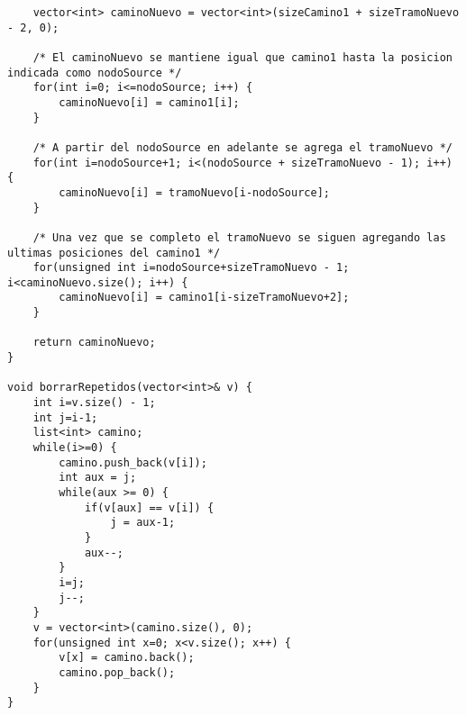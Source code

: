 \begin{lstlisting}
	vector<int> caminoNuevo = vector<int>(sizeCamino1 + sizeTramoNuevo - 2, 0);

	/* El caminoNuevo se mantiene igual que camino1 hasta la posicion indicada como nodoSource */
	for(int i=0; i<=nodoSource; i++) {
		caminoNuevo[i] = camino1[i];
	}

	/* A partir del nodoSource en adelante se agrega el tramoNuevo */
	for(int i=nodoSource+1; i<(nodoSource + sizeTramoNuevo - 1); i++) {
		caminoNuevo[i] = tramoNuevo[i-nodoSource];
	}

	/* Una vez que se completo el tramoNuevo se siguen agregando las ultimas posiciones del camino1 */
	for(unsigned int i=nodoSource+sizeTramoNuevo - 1; i<caminoNuevo.size(); i++) {
		caminoNuevo[i] = camino1[i-sizeTramoNuevo+2];
	}
	
	return caminoNuevo;
}

void borrarRepetidos(vector<int>& v) {
    int i=v.size() - 1;
    int j=i-1;
    list<int> camino;
    while(i>=0) {
        camino.push_back(v[i]);
        int aux = j;
        while(aux >= 0) {
            if(v[aux] == v[i]) {
            	j = aux-1;
            }
            aux--;
        }
        i=j;
        j--;
    }
    v = vector<int>(camino.size(), 0);
    for(unsigned int x=0; x<v.size(); x++) {
        v[x] = camino.back();
        camino.pop_back();
    }
}

\end{lstlisting}